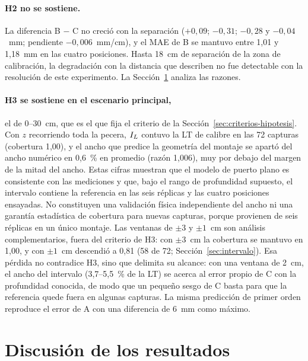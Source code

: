 \paragraph{H2 no se sostiene.} La diferencia B $-$ C no creció con la separación ($+0{,}09$; $-0{,}31$; $-0{,}28$ y $-0{,}04$~mm; pendiente $-0{,}006$~mm/cm), y el MAE de B se mantuvo entre 1,01 y 1,18~mm en las cuatro posiciones. Hasta 18~cm de separación de la zona de calibración, la degradación con la distancia que describen \textcite{Rofallski2022} no fue detectable con la resolución de este experimento. La Sección~\ref{sec:discusion} analiza las razones.

\paragraph{H3 se sostiene en el escenario principal,} el de 0--30~cm, que es el que fija el criterio de la Sección~\ref{sec:criterios-hipotesis}. Con $z$ recorriendo toda la pecera, $I_L$ contuvo la LT de calibre en las 72 capturas (cobertura 1,00), y el ancho que predice la geometría del montaje se apartó del ancho numérico en 0,6~\% en promedio (razón 1,006), muy por debajo del margen de la mitad del ancho. Estas cifras muestran que el modelo de puerto plano es consistente con las mediciones y que, bajo el rango de profundidad supuesto, el intervalo contiene la referencia en las seis réplicas y las cuatro posiciones ensayadas. No constituyen una validación física independiente del ancho ni una garantía estadística de cobertura para nuevas capturas, porque provienen de seis réplicas en un único montaje. Las ventanas de $\pm 3$ y $\pm 1$~cm son análisis complementarios, fuera del criterio de H3: con $\pm 3$~cm la cobertura se mantuvo en 1,00, y con $\pm 1$~cm descendió a 0,81 (58 de 72; Sección~\ref{sec:intervalo}). Esa pérdida no contradice H3, sino que delimita su alcance: con una ventana de 2~cm, el ancho del intervalo (3,7--5,5~\% de la LT) se acerca al error propio de C con la profundidad conocida, de modo que un pequeño sesgo de C basta para que la referencia quede fuera en algunas capturas. La misma predicción de primer orden reproduce el error de A con una diferencia de 6~mm como máximo.

\section{Discusión de los resultados}
\label{sec:discusion}

